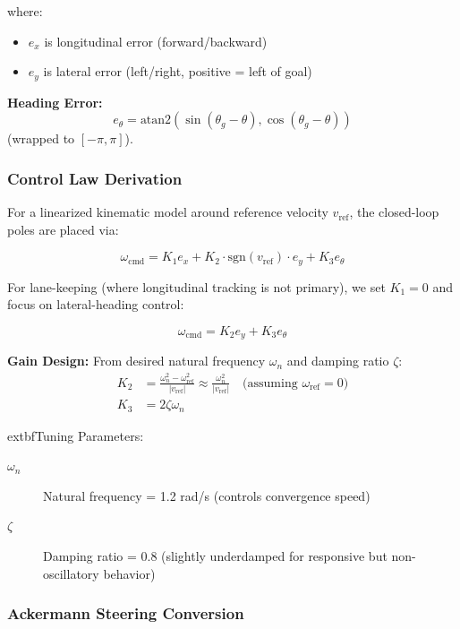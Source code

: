 \documentclass[12pt]{article}
\begin{document}
where:
\begin{itemize}
    \item $e_x$ is longitudinal error (forward/backward)
    \item $e_y$ is lateral error (left/right, positive = left of goal)
\end{itemize}

\textbf{Heading Error:}
\begin{equation}
e_\theta = \text{atan2}(\sin(\theta_g - \theta), \cos(\theta_g - \theta))
\end{equation}
(wrapped to $[-\pi, \pi]$).

\subsubsection{Control Law Derivation}

For a linearized kinematic model around reference velocity $v_{\text{ref}}$, the closed-loop poles are placed via:

\begin{equation}
\omega_{\text{cmd}} = K_1 e_x + K_2 \cdot \text{sgn}(v_{\text{ref}}) \cdot e_y + K_3 e_\theta
\end{equation}

For lane-keeping (where longitudinal tracking is not primary), we set $K_1 = 0$ and focus on lateral-heading control:

\begin{equation}
\boxed{\omega_{\text{cmd}} = K_2 e_y + K_3 e_\theta}
\end{equation}

\textbf{Gain Design:} From desired natural frequency $\omega_n$ and damping ratio $\zeta$:
\begin{align}
K_2 &= \frac{\omega_n^2 - \omega_{\text{ref}}^2}{|v_{\text{ref}}|} \approx \frac{\omega_n^2}{|v_{\text{ref}}|} \quad \text{(assuming } \omega_{\text{ref}} = 0 \text{)} \\
K_3 &= 2 \zeta \omega_n
\end{align}

	extbf{Tuning Parameters:}
\begin{description}
    \item[\textbf{$\omega_n$}] Natural frequency = 1.2 rad/s (controls convergence speed)
    \item[\textbf{$\zeta$}] Damping ratio = 0.8 (slightly underdamped for responsive but non-oscillatory behavior)
\end{description}

\subsubsection{Ackermann Steering Conversion}
\end{document}
